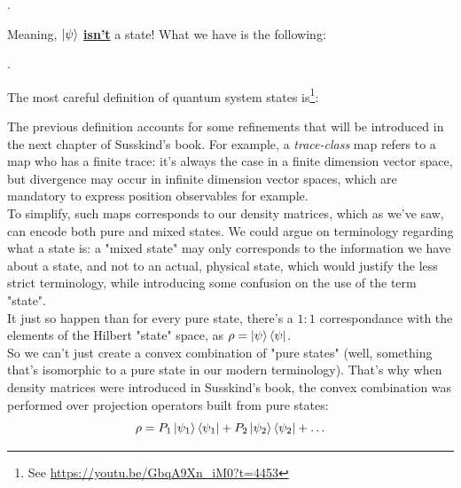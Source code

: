 \documentclass[solutions.tex]{subfiles}
\begin{document}
\begin{center}
.
\end{center}

Meaning, $|\psi\rangle$ \textbf{\underline{isn't}} a state! What we have
is the following:

\begin{center}
.
\end{center}

The most careful definition of quantum system states is\footnote{See
\url{https://youtu.be/GbqA9Xn_iM0?t=4453}}:

\begin{center}
\end{center}

The previous definition accounts for some refinements that will
be introduced in the next chapter of Susskind's book. For example, a
\textit{trace-class} map refers to a map who has a finite trace: it's
always the case in a finite dimension vector space, but divergence may
occur in infinite dimension vector spaces, which are mandatory to
express position observables for example. \\

To simplify, such maps corresponds to our density matrices,
which as we've saw, can encode both pure and mixed states. We could argue on
terminology regarding what a state is: a "mixed state" may only corresponds
to the information we have about a state, and not to an actual, physical state,
which would justify the less strict terminology, while introducing
some confusion on the use of the term "state".\\

It just so happen than for every pure state, there's a $1:1$ correspondance
with the elements of the Hilbert "state" space, as $\rho = \left| \psi \right\rangle\left\langle \psi \right|$. \\

So we can't just create a convex combination of "pure states" (well, something
that's isomorphic to a pure state in our modern terminology). That's why when
density matrices were introduced in Susskind's book, the convex combination
was performed over projection operators built from pure states:
\[
	\rho = P_1\left| \psi_1 \right\rangle\left\langle \psi_1 \right| +  P_2\left| \psi_2 \right\rangle\left\langle \psi_2 \right| + \ldots
\]
\end{document}
